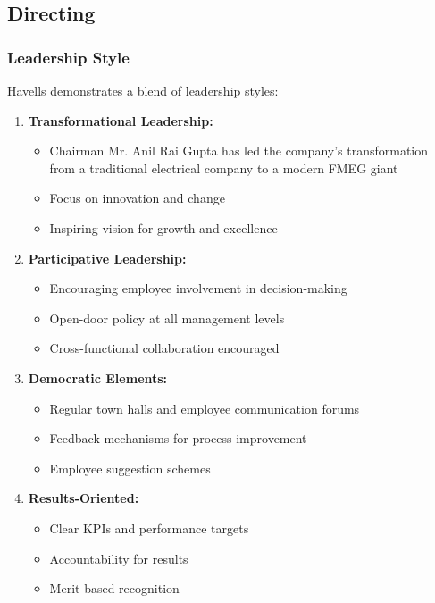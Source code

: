 \documentclass[12pt,a4paper]{article}
\begin{document}
\subsection{Directing}

\subsubsection{Leadership Style}

Havells demonstrates a blend of leadership styles:

\begin{enumerate}[leftmargin=*]
    \item \textbf{Transformational Leadership:}
    \begin{itemize}
        \item Chairman Mr. Anil Rai Gupta has led the company's transformation from a traditional electrical company to a modern FMEG giant
        \item Focus on innovation and change
        \item Inspiring vision for growth and excellence
    \end{itemize}
    
    \item \textbf{Participative Leadership:}
    \begin{itemize}
        \item Encouraging employee involvement in decision-making
        \item Open-door policy at all management levels
        \item Cross-functional collaboration encouraged
    \end{itemize}
    
    \item \textbf{Democratic Elements:}
    \begin{itemize}
        \item Regular town halls and employee communication forums
        \item Feedback mechanisms for process improvement
        \item Employee suggestion schemes
    \end{itemize}
    
    \item \textbf{Results-Oriented:}
    \begin{itemize}
        \item Clear KPIs and performance targets
        \item Accountability for results
        \item Merit-based recognition
    \end{itemize}
\end{enumerate}
\end{document}
